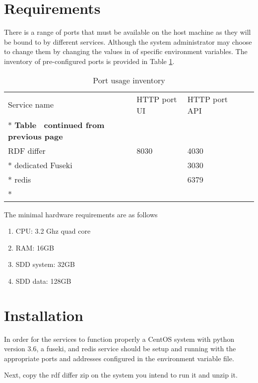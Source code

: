 \section{Requirements}
\label{sec:requirements}
There is a range of ports that must be available on the host machine as they will be bound to by different services. Although the system administrator may choose to change them by changing the values in of specific environment variables. The inventory of pre-configured ports is provided in Table \ref{tab:port-inventory}.

\begin{longtable}[c]{@{}p{3.64cm}p{1.25cm}p{1.25cm}p{1.9cm}p{5cm}@{}}
	\toprule
	Service name     & HTTP port UI & HTTP port API             \\* \midrule
	\endfirsthead
	\multicolumn{5}{c}%
	{{\bfseries Table \thetable\ continued from previous page}} \\
	\endhead
	\bottomrule
	\endfoot
	\endlastfoot
	RDF differ       & 8030         & 4030                      \\* \hline
	dedicated Fuseki &              & 3030                      \\* \hline
	redis            &              & 6379                      \\* \bottomrule
	\caption{Port usage inventory}
	\label{tab:port-inventory}                                  \\
\end{longtable}

The minimal hardware requirements are as follows 
\begin{enumerate}
	\item CPU: 3.2 Ghz quad core
	\item RAM: 16GB
	\item SDD system: 32GB
	\item SDD data: 128GB
\end{enumerate}

\section{Installation}
\label{sec:installation}
In order for the services to function properly a CentOS system with python version 3.6, a fuseki, and redis service should be setup and running with the appropriate ports and addresses configured in the environment variable file. 

Next, copy the rdf differ zip on the system you intend to run it and unzip it.

